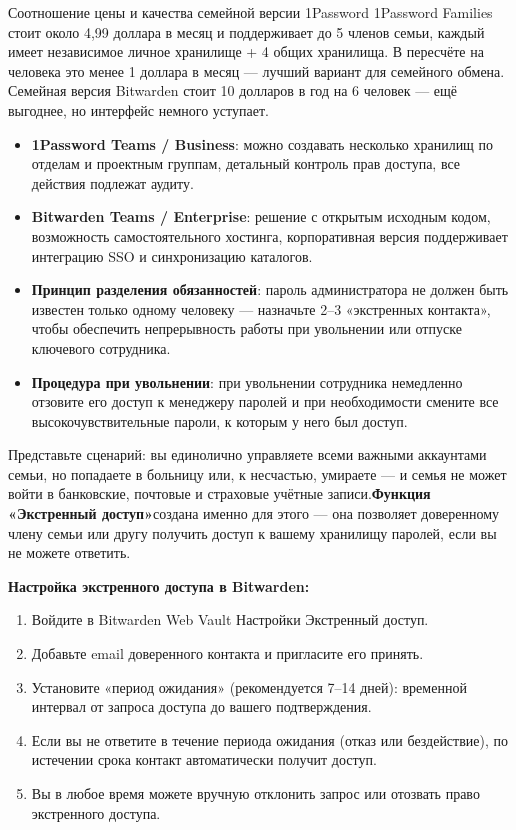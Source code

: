 \begin{tcbinfo}{Соотношение цены и качества семейной версии 1Password}
1Password Families стоит около 4,99 доллара в месяц и поддерживает до 5 членов семьи, каждый имеет независимое личное хранилище + 4 общих хранилища. В пересчёте на человека это менее 1 доллара в месяц — лучший вариант для семейного обмена. Семейная версия Bitwarden стоит 10 долларов в год на 6 человек — ещё выгоднее, но интерфейс немного уступает.

\end{tcbinfo}


\begin{itemize}
  \item \textbf{1Password Teams / Business}: можно создавать несколько хранилищ по отделам и проектным группам, детальный контроль прав доступа, все действия подлежат аудиту.
  \item \textbf{Bitwarden Teams / Enterprise}: решение с открытым исходным кодом, возможность самостоятельного хостинга, корпоративная версия поддерживает интеграцию SSO и синхронизацию каталогов.
  \item \textbf{Принцип разделения обязанностей}: пароль администратора не должен быть известен только одному человеку — назначьте 2–3 «экстренных контакта», чтобы обеспечить непрерывность работы при увольнении или отпуске ключевого сотрудника.
  \item \textbf{Процедура при увольнении}: при увольнении сотрудника немедленно отзовите его доступ к менеджеру паролей и при необходимости смените все высокочувствительные пароли, к которым у него был доступ.
\end{itemize}


Представьте сценарий: вы единолично управляете всеми важными аккаунтами семьи, но попадаете в больницу или, к несчастью, умираете — и семья не может войти в банковские, почтовые и страховые учётные записи.\textbf{Функция «Экстренный доступ»}создана именно для этого — она позволяет доверенному члену семьи или другу получить доступ к вашему хранилищу паролей, если вы не можете ответить.

\textbf{Настройка экстренного доступа в Bitwarden:}

\begin{enumerate}
  \item Войдите в Bitwarden Web Vault Настройки Экстренный доступ.
  \item Добавьте email доверенного контакта и пригласите его принять.
  \item Установите «период ожидания» (рекомендуется 7–14 дней): временной интервал от запроса доступа до вашего подтверждения.
  \item Если вы не ответите в течение периода ожидания (отказ или бездействие), по истечении срока контакт автоматически получит доступ.
  \item Вы в любое время можете вручную отклонить запрос или отозвать право экстренного доступа.
\end{enumerate}

